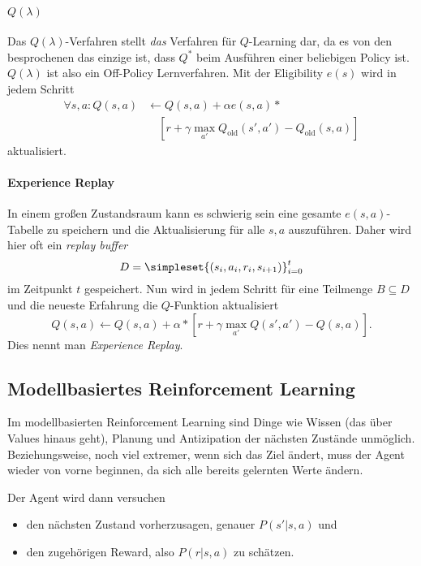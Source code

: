 \documentclass[ngerman]{../LaTeX-Templates/Paper/paper}
\begin{document}
\paragraph{$Q(\lambda)$}
Das $Q(\lambda)$-Verfahren stellt \emph{das} Verfahren für $Q$-Learning dar, da es von den besprochenen das einzige ist, dass $Q^\ast$ beim Ausführen einer beliebigen Policy ist. $Q(\lambda)$ ist also ein Off-Policy Lernverfahren.
Mit der Eligibility $e(s)$ wird in jedem Schritt 
\begin{align*}
	\forall s,a:Q(s,a)&\leftarrow Q(s,a)+\alpha e(s,a)*\\
	&\quad[r+\gamma \max_{a'} Q_{\text{old}}(s',a')-Q_{\text{old}}(s,a)]
\end{align*}
aktualisiert.





\paragraph{Experience Replay}
In einem großen Zustandsraum kann es schwierig sein eine gesamte $e(s,a)$-Tabelle zu speichern und die Aktualisierung für alle $s,a$ auszuführen. Daher wird hier oft ein \emph{replay buffer}
\begin{equation*}
	D=\simpleset{(s_i,a_i,r_i,s_{i+1})}_{i=0}^t
\end{equation*}
im Zeitpunkt $t$ gespeichert. Nun wird in jedem Schritt für eine Teilmenge $B\subseteq D$ und die neueste Erfahrung die $Q$-Funktion aktualisiert
\begin{equation*}
	Q(s,a)\leftarrow Q(s,a)+\alpha*[r+\gamma\max_{a'}Q(s',a')-Q(s,a)].
\end{equation*}
Dies nennt man \emph{Experience Replay}.

\subsection{Modellbasiertes Reinforcement Learning}
Im modellbasierten Reinforcement Learning sind Dinge wie Wissen (das über Values hinaus geht), Planung und Antizipation der nächsten Zustände unmöglich.
Beziehungsweise, noch viel extremer, wenn sich das Ziel ändert, muss der Agent wieder von vorne beginnen, da sich alle bereits gelernten Werte ändern.




Der Agent wird dann versuchen
\begin{itemize}
	\item den nächsten Zustand vorherzusagen, genauer $P(s'|s,a)$ und
	\item den zugehörigen Reward, also $P(r|s,a)$ zu schätzen.
\end{itemize}
\end{document}
